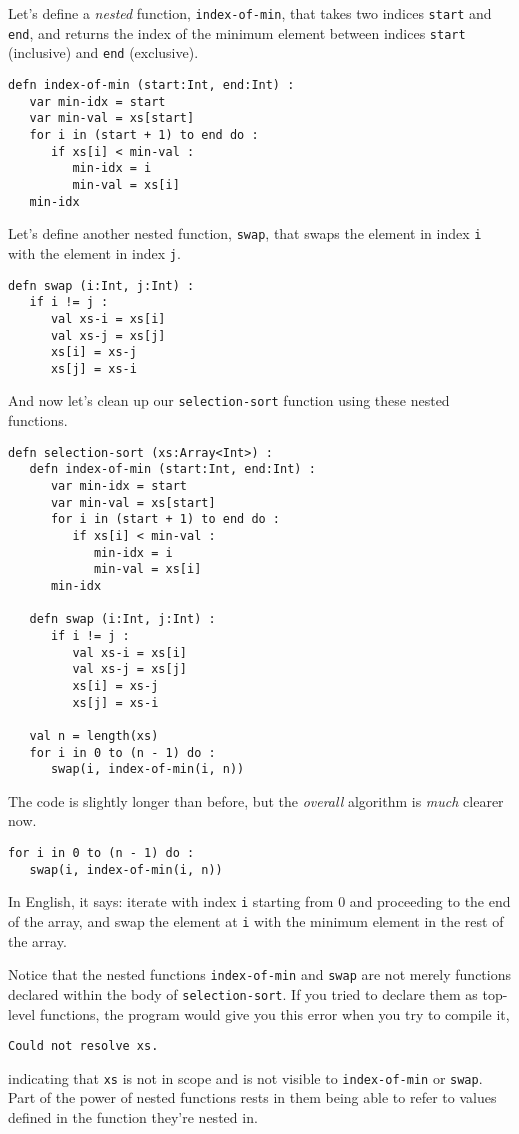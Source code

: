 \documentclass[10pt,oneside]{book}
\begin{document}
Let's define a {\em nested} function, \texttt{\frenchspacing index-of-min}, that takes two indices \texttt{\frenchspacing start} and \texttt{\frenchspacing end}, and returns the index of the minimum element between indices \texttt{\frenchspacing start} (inclusive) and \texttt{\frenchspacing end} (exclusive).
\begin{lstlisting}
defn index-of-min (start:Int, end:Int) :
   var min-idx = start
   var min-val = xs[start]
   for i in (start + 1) to end do :
      if xs[i] < min-val :
         min-idx = i
         min-val = xs[i]
   min-idx      
\end{lstlisting}

Let's define another nested function, \texttt{\frenchspacing swap}, that swaps the element in index \texttt{\frenchspacing i} with the element in index \texttt{\frenchspacing j}. 
\begin{lstlisting}
defn swap (i:Int, j:Int) :
   if i != j :
      val xs-i = xs[i]
      val xs-j = xs[j]
      xs[i] = xs-j
      xs[j] = xs-i
\end{lstlisting}

And now let's clean up our \texttt{\frenchspacing selection-sort} function using these nested functions.
\begin{lstlisting}
defn selection-sort (xs:Array<Int>) :
   defn index-of-min (start:Int, end:Int) :
      var min-idx = start
      var min-val = xs[start]
      for i in (start + 1) to end do :
         if xs[i] < min-val :
            min-idx = i
            min-val = xs[i]
      min-idx

   defn swap (i:Int, j:Int) :
      if i != j :
         val xs-i = xs[i]
         val xs-j = xs[j]
         xs[i] = xs-j
         xs[j] = xs-i
   
   val n = length(xs)
   for i in 0 to (n - 1) do :
      swap(i, index-of-min(i, n))
\end{lstlisting}
The code is slightly longer than before, but the {\em overall} algorithm is {\em much} clearer now. 
\begin{lstlisting}
for i in 0 to (n - 1) do :
   swap(i, index-of-min(i, n))
\end{lstlisting}
In English, it says: iterate with index \texttt{\frenchspacing i} starting from 0 and proceeding to the end of the array, and swap the element at \texttt{\frenchspacing i} with the minimum element in the rest of the array. 

Notice that the nested functions \texttt{\frenchspacing index-of-min} and \texttt{\frenchspacing swap} are not merely functions declared within the body of \texttt{\frenchspacing selection-sort}. If you tried to declare them as top-level functions, the program would give you this error when you try to compile it,
\begin{lstlisting}
Could not resolve xs.
\end{lstlisting}
indicating that \texttt{\frenchspacing xs} is not in scope and is not visible to \texttt{\frenchspacing index-of-min} or \texttt{\frenchspacing swap}. Part of the power of nested functions rests in them being able to refer to values defined in the function they're nested in.
\end{document}
